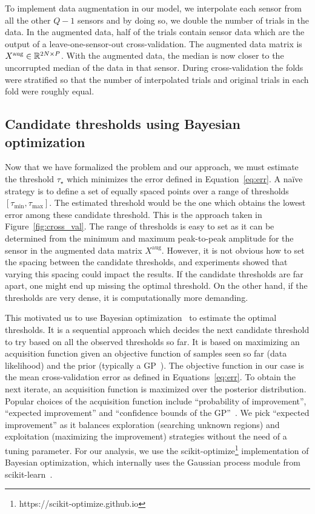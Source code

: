 To implement data augmentation in our model, we interpolate each sensor from all the other $Q-1$ sensors and by doing so, we double the number of trials in the data. In the augmented data, half of the trials contain sensor data which are the output of a leave-one-sensor-out cross-validation. The augmented data matrix is $X^{\textrm{aug}} \in \mathbb{R}^{2N \times P}$. With the augmented data, the median is now closer to the uncorrupted median of the data in that sensor. During cross-validation the folds were stratified so that the number of interpolated trials and original trials in each fold were roughly equal.

\subsection{Candidate thresholds using Bayesian optimization}
\label{sec:bayesian_opt}
Now that we have formalized the problem and our approach, we must estimate the threshold $\tau_{\star}$ which minimizes the error defined in Equation~\eqref{eq:err}. A na\"ive strategy is to define a set of equally spaced points over a range of thresholds $[\tau_{\min}, \tau_{\max}]$. The estimated threshold would be the one which obtains the lowest error among these candidate threshold. This is the approach taken in Figure~\ref{fig:cross_val}. The range of thresholds is easy to set as it can be determined from the minimum and maximum peak-to-peak amplitude for the sensor in the augmented data matrix $X^{\textrm{aug}}$. However, it is not obvious how to set the spacing between the candidate thresholds, and experiments showed that varying this spacing could impact the results. If the candidate thresholds are far apart, one might end up missing the optimal threshold. On the other hand, if the thresholds are very dense, it is computationally more demanding.

This motivated us to use Bayesian optimization~\citep{snoek2012practical, bergstra2011algorithms} to estimate the optimal thresholds. It is a sequential approach which decides the next candidate threshold to try based on all the observed thresholds so far. It is based on maximizing an acquisition function given an objective function of samples seen so far (data likelihood) and the prior (typically a \ac{GP}~\citep{rasmussen2006gaussian}). The objective function in our case is the mean cross-validation error as defined in Equations~\eqref{eq:err}. To obtain the next iterate, an acquisition function is maximized over the posterior distribution. Popular choices of the acquisition function include ``probability of improvement'', ``expected improvement'' and ``confidence bounds of the \ac{GP}''~\citep{snoek2012practical}. We pick ``expected improvement'' as it balances exploration (searching unknown regions) and exploitation (maximizing the improvement) strategies without the need of a tuning parameter. For our analysis, we use the scikit-optimize\footnote{https://scikit-optimize.github.io} implementation of Bayesian optimization, which internally uses the Gaussian process module from scikit-learn~\citep{scikit-learn}.

